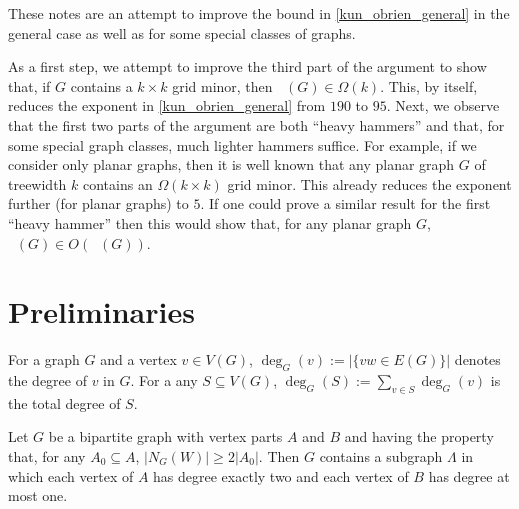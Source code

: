 \documentclass{patmorin}
\DeclareMathOperator{\chicen}{\chi_{\mathrm{cen}}}
\DeclareMathOperator{\chilin}{\chi_{\mathrm{lin}}}
\begin{document}
These notes are an attempt to improve the bound in \cref{kun_obrien_general} in the general case as well as for some special classes of graphs.

As a first step, we attempt to improve the third part of the argument to show that, if $G$ contains a $k\times k$ grid minor, then $\chilin(G)\in \Omega(k)$.  This, by itself, reduces the exponent in \cref{kun_obrien_general} from $190$ to $95$.  Next, we observe that the first two parts of the argument are both ``heavy hammers'' and that, for some special graph classes, much lighter hammers suffice.  For example, if we consider only planar graphs, then it is well known that any planar graph $G$ of treewidth $k$ contains an $\Omega(k\times k)$ grid minor.  This already reduces the exponent further (for planar graphs) to $5$.  If one could prove a similar result for the first ``heavy hammer'' then this would show that, for any planar graph $G$, $\chicen(G)\in O(\chilin(G))$.


\section{Preliminaries}

For a graph $G$ and a vertex $v\in V(G)$, $\deg_G(v):=|\{vw\in E(G)\}|$ denotes the degree of $v$ in $G$.  For a any $S\subseteq V(G)$, $\deg_G(S):=\sum_{v\in S}\deg_G(v)$ is the total degree of $S$.

\begin{lem}\label{hall_vees}
  Let $G$ be a bipartite graph with vertex parts $A$ and $B$ and having the property that, for any $A_0\subseteq A$, $|N_G(W)|\ge 2|A_0|$.  Then $G$ contains a subgraph $\Lambda$ in which each vertex of $A$ has degree exactly two and each vertex of $B$ has degree at most one.
\end{lem}
\end{document}
